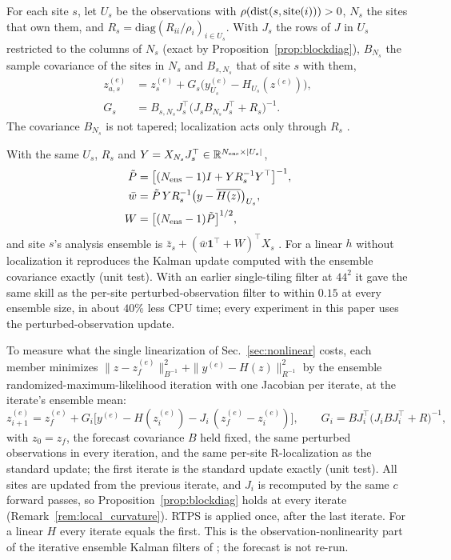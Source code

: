  For each site $s$, let $U_s$ be the observations
with $\rho(\operatorname{dist}(s,\mathrm{site}(i)))>0$, $N_s$ the sites that own them,
and $R_s=\mathrm{diag}(R_{ii}/\rho_i)_{i\in U_s}$. With $J_s$ the rows of $J$
in $U_s$ restricted to the columns of $N_s$ (exact by
Proposition~\ref{prop:blockdiag}), $B_{N_s}$ the sample covariance of the
sites in $N_s$ and $B_{s,N_s}$ that of site $s$ with them,
\begin{equation}
\begin{aligned}
  z_{a,s}^{(e)} &= z_s^{(e)} + G_s\big(y^{(e)}_{U_s}-H_{U_s}(z^{(e)})\big),\\
  G_s &= B_{s,N_s}J_s^\top\big(J_sB_{N_s}J_s^\top+R_s\big)^{-1}.
\end{aligned}
\end{equation}
The covariance $B_{N_s}$ is not tapered; localization acts only through
$R_s$ \citep{hunt2007}.

 With the same $U_s$, $R_s$ and
$Y=X_{N_s}J_s^\top\in\mathbb{R}^{N_{\mathrm{ens}}\times|U_s|}$,
\begin{equation}
\begin{aligned}
  \tilde P &= \big[(N_{\mathrm{ens}}-1)I+YR_s^{-1}Y^\top\big]^{-1},\\
  \bar w &= \tilde P\,YR_s^{-1}\big(y-\overline{H(z)}\big)_{U_s},\\
  W &= \big[(N_{\mathrm{ens}}-1)\tilde P\big]^{1/2},
\end{aligned}
\end{equation}
and site $s$'s analysis ensemble is $\bar z_s + (\bar w\mathbf 1^\top+W)^\top X_s$
\citep{hunt2007}. For a linear $h$ without localization it reproduces
the Kalman update computed with the ensemble covariance exactly (unit
test). With an earlier single-tiling filter at $44^2$ it gave the same skill as the per-site
perturbed-observation filter to within $0.15$ at every ensemble size, in about $40\%$ less CPU time;
every experiment in this paper uses the perturbed-observation update.

 To measure what the single
linearization of Sec.~\ref{sec:nonlinear} costs, each member minimizes
$\|z-z_f^{(e)}\|^2_{B^{-1}}+\|y^{(e)}-H(z)\|^2_{R^{-1}}$ by the ensemble
randomized-maximum-likelihood iteration \citep{guoliver2007,chenoliver2012}
with one Jacobian per iterate, at the iterate's ensemble mean:
\begin{equation}
  z_{i+1}^{(e)} = z_f^{(e)} + G_i\big[y^{(e)} - H(z_i^{(e)}) - J_i\,(z_f^{(e)}-z_i^{(e)})\big],\qquad
  G_i = B J_i^\top\big(J_i B J_i^\top + R\big)^{-1},
  \label{eq:iterative}
\end{equation}
with $z_0=z_f$, the forecast covariance $B$ held fixed, the same perturbed
observations in every iteration, and the same per-site R-localization as
the standard update; the first iterate is the standard update exactly
(unit test). All sites are updated from the previous iterate, and $J_i$ is
recomputed by the same $c$ forward passes, so Proposition~\ref{prop:blockdiag}
holds at every iterate (Remark~\ref{rem:local_curvature}). RTPS is applied once,
after the last iterate. For a linear $H$ every iterate equals the first.
This is the observation-nonlinearity part of the iterative ensemble Kalman
filters of \citet{sakov2012}; the forecast is not re-run.

